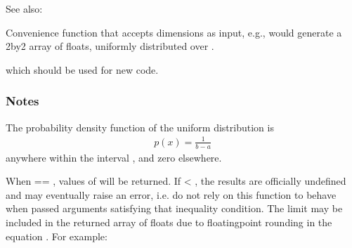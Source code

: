 \documentclass[letterpaper,10pt,english]{sphinxmanual}
\begin{document}
\begin{fulllineitems}
\begin{sphinxseealso}{See also:}
\begin{description}
\sphinxAtStartPar
Convenience function that accepts dimensions as input, e.g.,  would generate a 2\sphinxhyphen{}by\sphinxhyphen{}2 array of floats, uniformly distributed over \sphinxcode{\sphinxupquote{{[}0, 1)}}.

\sphinxAtStartPar
which should be used for new code.

\end{description}


\end{sphinxseealso}

\subsubsection*{Notes}

\sphinxAtStartPar
The probability density function of the uniform distribution is
\begin{equation*}
\begin{split}p(x) = \frac{1}{b - a}\end{split}
\end{equation*}
\sphinxAtStartPar
anywhere within the interval \sphinxcode{\sphinxupquote{{[}a, b)}}, and zero elsewhere.

\sphinxAtStartPar
When  == , values of  will be returned.
If  \textless{} , the results are officially undefined
and may eventually raise an error, i.e. do not rely on this
function to behave when passed arguments satisfying that
inequality condition. The  limit may be included in the
returned array of floats due to floating\sphinxhyphen{}point rounding in the
equation . For example:

\begin{sphinxVerbatim}[commandchars=\\\{\}]
  
\end{sphinxVerbatim}

\end{fulllineitems}
\end{document}

